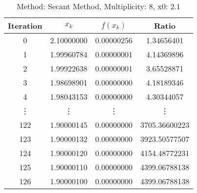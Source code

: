 \begin{table}
\centering
\caption{Method: Secant Method, Multiplicity: 8, x0: 2.1}
\label{tab:table_Secant_Method_8_2_1}
\begin{tabular}{c c c c}
\toprule
Iteration &      $x_k$ &   $f(x_k)$ &         Ratio \\
\midrule
        0 & 2.10000000 & 0.00000256 &    1.34656401 \\
        1 & 1.99960784 & 0.00000001 &    4.14369896 \\
        2 & 1.99922638 & 0.00000001 &    3.65528871 \\
        3 & 1.98698901 & 0.00000000 &    4.18189346 \\
        4 & 1.98043153 & 0.00000000 &    4.30344057 \\
   \vdots &     \vdots &     \vdots &        \vdots \\
      122 & 1.90000145 & 0.00000000 & 3705.36600223 \\
      123 & 1.90000132 & 0.00000000 & 3923.50577507 \\
      124 & 1.90000120 & 0.00000000 & 4154.48772231 \\
      125 & 1.90000110 & 0.00000000 & 4399.06788138 \\
      126 & 1.90000100 & 0.00000000 & 4399.06788138 \\
\bottomrule
\end{tabular}
\end{table}
